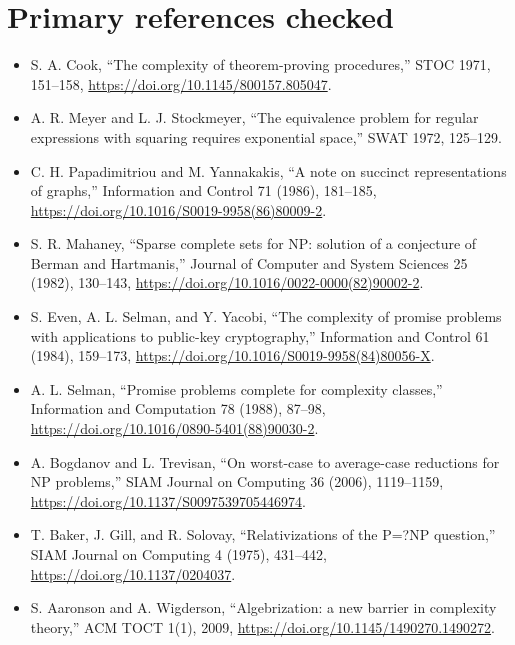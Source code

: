 \documentclass[11pt]{article}
\begin{document}
\section*{Primary references checked}
\begin{itemize}
\item S. A. Cook, ``The complexity of theorem-proving procedures,'' STOC
1971, 151--158, \url{https://doi.org/10.1145/800157.805047}.
\item A. R. Meyer and L. J. Stockmeyer, ``The equivalence problem for regular
expressions with squaring requires exponential space,'' SWAT 1972, 125--129.
\item C. H. Papadimitriou and M. Yannakakis, ``A note on succinct
representations of graphs,'' Information and Control 71 (1986), 181--185,
\url{https://doi.org/10.1016/S0019-9958(86)80009-2}.
\item S. R. Mahaney, ``Sparse complete sets for NP: solution of a conjecture
of Berman and Hartmanis,'' Journal of Computer and System Sciences 25 (1982),
130--143, \url{https://doi.org/10.1016/0022-0000(82)90002-2}.
\item S. Even, A. L. Selman, and Y. Yacobi, ``The complexity of promise
problems with applications to public-key cryptography,'' Information and
Control 61 (1984), 159--173,
\url{https://doi.org/10.1016/S0019-9958(84)80056-X}.
\item A. L. Selman, ``Promise problems complete for complexity classes,''
Information and Computation 78 (1988), 87--98,
\url{https://doi.org/10.1016/0890-5401(88)90030-2}.
\item A. Bogdanov and L. Trevisan, ``On worst-case to average-case reductions
for NP problems,'' SIAM Journal on Computing 36 (2006), 1119--1159,
\url{https://doi.org/10.1137/S0097539705446974}.
\item T. Baker, J. Gill, and R. Solovay, ``Relativizations of the P=?NP
question,'' SIAM Journal on Computing 4 (1975), 431--442,
\url{https://doi.org/10.1137/0204037}.
\item S. Aaronson and A. Wigderson, ``Algebrization: a new barrier in
complexity theory,'' ACM TOCT 1(1), 2009,
\url{https://doi.org/10.1145/1490270.1490272}.
\end{itemize}

\end{document}
